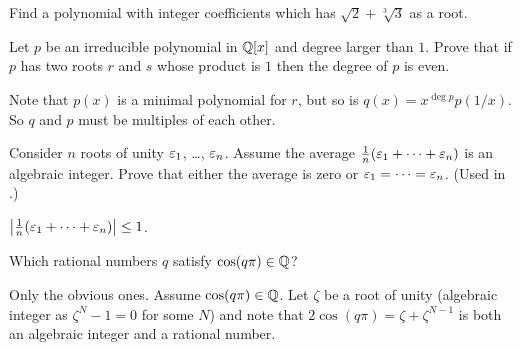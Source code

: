 \section{\problemhead}

\begin{problem}
	Find a polynomial with integer coefficients
	which has $\sqrt2+\sqrt[3]{3}$ as a root.
\end{problem}

\begin{problem}
	[Brazil 2006]
	\onechili
	Let $p$ be an irreducible polynomial in $\mathbb Q[x]$
	and degree larger than $1$.
	Prove that if $p$ has two roots $r$ and $s$ whose product is $1$
	then the degree of $p$ is even.
	\begin{hint}
		Note that $p(x)$ is a minimal polynomial for $r$,
		but so is $q(x) = x^{\deg p} p(1/x)$.
		So $q$ and $p$ must be multiples of each other.
	\end{hint}
\end{problem}

\begin{sproblem}
	\label{prob:rep_lemma}
	Consider $n$ roots of unity $\varepsilon_1$, \dots, $\varepsilon_n$.
	Assume the average $\frac1n(\varepsilon_1 + \dots + \varepsilon_n)$ is an algebraic integer.
	Prove that either the average is zero or $\varepsilon_1 = \dots = \varepsilon_n$.
	(Used in .)
	\begin{hint}
		$\left\lvert \frac 1n(\varepsilon_1 + \dots + \varepsilon_n) \right\rvert \le 1$.
	\end{hint}
\end{sproblem}

\begin{dproblem}
	\onechili
	Which rational numbers $q$ satisfy $\cos(q\pi) \in \mathbb Q$?
	\begin{hint}
		Only the obvious ones.
		Assume $\cos(q\pi) \in \mathbb Q$.
		Let $\zeta$ be a root of unity (algebraic integer
		as $\zeta^N-1 = 0$ for some $N$)
		and note that $2\cos(q\pi) = \zeta + \zeta^{N-1}$
		is both an algebraic integer and a rational number.
	\end{hint}
\end{dproblem}

